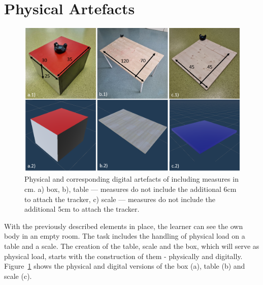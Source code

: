 \section{Physical Artefacts}
\label{sec:artefacts}
\begin{figure}[H]
	\centering
	\includegraphics[width=\textwidth]{figures/artefacts.png}	
	\caption[Artefacts of \exgo]{Physical and corresponding digital artefacts of \exgo including measures in cm. a) box, b), table --- measures do not include the additional 6cm to attach the tracker, c) scale --- measures do not include the additional 5cm to attach the tracker.}
	\label{fig:artefacts}
\end{figure}
With the previously described elements in place, the learner can see the own body in an empty room. The task includes the handling of physical load on a table and a scale. The creation of the table, scale and the box, which will serve as physical load, starts with the construction of them - physically and digitally. Figure~\ref{fig:artefacts} shows the physical and digital versions of the box (a), table (b) and scale (c).\\
